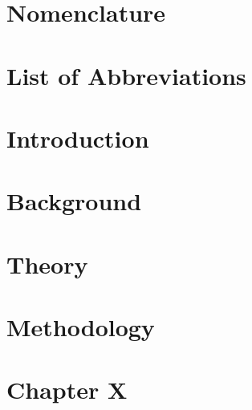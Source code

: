 \documentclass[11pt]{report}
\begin{document}
	\chapter*{Nomenclature}
		\label{sec:def}
		\fancyhead{} %
\newpage

	\chapter*{List of Abbreviations}
		\label{sec:abbr}
		\fancyhead{} %
\newpage

\cleardoublepage{}%
\fancyhead{} %
\fancyhead[R]{\leftmark} %

\chapter{Introduction}


\chapter{Background}


\chapter{Theory}


\chapter{Methodology}


\chapter{Chapter X}


\end{document}
